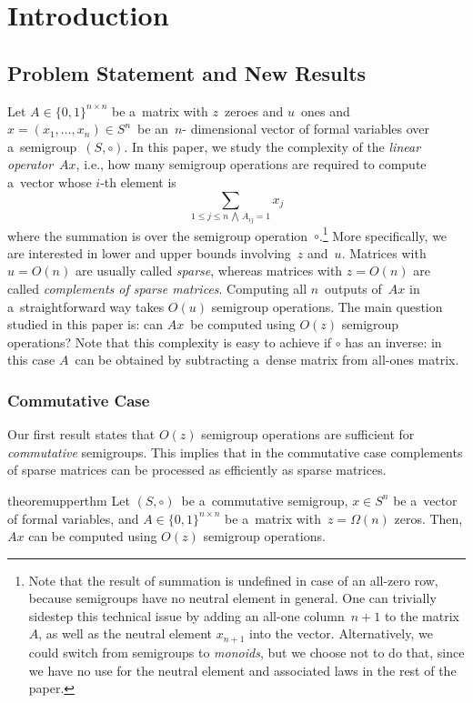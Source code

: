 \documentclass[11pt,letterpaper]{article}
\begin{document}
\clearpage
\tableofcontents
\clearpage

\section{Introduction}
\subsection{Problem Statement and New Results}

Let $A \in \{0,1\}^{n \times n}$ be a~matrix with $z$~zeroes
and $u$~ones and $x=(x_1, \dotsc, x_n) \in S^n$~be an~$n$-
dimensional vector
of formal variables over a~semigroup~$(S, \circ)$. In this paper, 
we study the
complexity of the \emph{linear operator}~$Ax$, 
i.e., how many semigroup
operations are required to compute a~vector whose $i$-th element is
\[
\sum_{1 \le j \le n\,\bigwedge\,A_{ij}=1}x_j
\]
where the summation is over the semigroup operation~$\circ$.\footnote{Note that the result of
summation is undefined in case of an all-zero row, because semigroups have no
neutral element in general. One can trivially sidestep this technical issue by
adding an all-one column~$n+1$ to the matrix~$A$, as well as the neutral element
$x_{n+1}$ into the vector. Alternatively, we could switch from semigroups to
\emph{monoids}, but we choose not to do that, since we have no use
for the neutral element and associated laws in the rest of the paper.}
More specifically, we are interested in lower and
upper bounds involving~$z$ and~$u$.
Matrices with $u=O(n)$ are usually called \emph{sparse},
whereas matrices with $z=O(n)$
are called \emph{complements of sparse matrices}.
Computing all $n$~outputs
of~$Ax$ in a~straightforward way takes
$O(u)$ semigroup operations.
The main question studied in this paper is:
can $Ax$~be computed using $O(z)$ semigroup
operations? Note that this complexity is easy to achieve if $\circ$ has an inverse: in this case $A$~can be obtained by subtracting 
a~dense matrix from all-ones matrix. 

\subsubsection{Commutative Case}
Our first result states that $O(z)$ semigroup operations
are sufficient for \emph{commutative} semigroups. This implies
that in the commutative case complements of sparse 
matrices can be processed as
efficiently as sparse matrices.

\begin{restatable}{theorem}{upperthm}
\label{thm:upperbound}
Let $(S, \circ)$~be a~commutative semigroup, 
$x \in S^n$ be a~vector of formal
variables, and $A \in \{0,1\}^{n \times n}$ be a~matrix 
with~$z=\Omega(n)$ 
zeros. Then, $Ax$ can be computed using
$O(z)$ semigroup operations.
\end{restatable}
\end{document}
